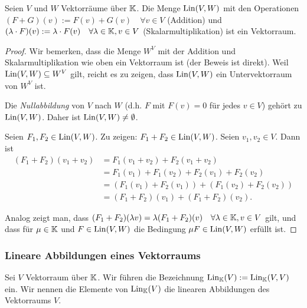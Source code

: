 \begin{propn}
	Seien $ V $ und $ W $ Vektorräume über $ \mathbb K $. Die Menge $ \operatorname{Lin}(V,W) $ mit den Operationen $ (F+G)(v) := F(v) + G(v) \quad \forall v \in V $ (Addition) und $ (\lambda \cdot F)(v) := \lambda \cdot F(v) \quad \forall \lambda \in \mathbb K, v \in V $ (Skalarmultiplikation) ist ein Vektorraum.
\end{propn}
\begin{proof}
	Wir bemerken, dass die Menge $ W^V $ mit der Addition und Skalarmultiplikation wie oben ein Vektorraum ist (der Beweis ist direkt). Weil $ \operatorname{Lin}(V,W) \subseteq W^V $ gilt, reicht es zu zeigen, dass $ \operatorname{Lin}(V,W) $ ein Untervektorraum von $ W^V $ ist.
	
	Die \emph{Nullabbildung} von $ V $ nach $ W $ (d.h. $ F $ mit $ F(v) = 0 $ für jedes $ v \in V $) gehört zu $ \operatorname{Lin}(V,W) $. Daher ist $ \operatorname{Lin}(V,W) \neq \emptyset $.
	
	Seien $ F_1, F_2 \in \operatorname{Lin}(V,W) $. Zu zeigen: $ F_1 + F_2 \in \operatorname{Lin}(V,W) $. Seien $ v_1, v_2 \in V $. Dann ist
	\begin{align*}
		(F_1+F_2)(v_1+v_2) &= F_1(v_1+v_2) + F_2(v_1+v_2)\\
		&= F_1(v_1) + F_1(v_2) + F_2(v_1) + F_2(v_2)\\
		&= (F_1(v_1)+F_2(v_1)) + (F_1(v_2)+F_2(v_2))\\
		&= (F_1+F_2)(v_1) + (F_1+F_2)(v_2).
	\end{align*}
	
	Analog zeigt man, dass $ (F_1+F_2)(\lambda v) = \lambda(F_1+F_2)(v) \quad \forall\lambda\in\mathbb K, v \in V $ gilt, und dass für $ \mu \in \mathbb K $ und $ F \in \operatorname{Lin}(V,W) $ die Bedingung $ \mu F \in \operatorname{Lin}(V,W) $ erfüllt ist.
\end{proof}

\subsubsection{Lineare Abbildungen eines Vektorraums}

Sei $ V $ Vektorraum über $ \mathbb K $. Wir führen die Bezeichnung $ \operatorname{Lin}_\mathbb K(V) := \operatorname{Lin}_\mathbb K(V,V) $ ein. Wir nennen die Elemente von $ \operatorname{Lin}_\mathbb K(V) $ die linearen Abbildungen des Vektorraums $ V $.


